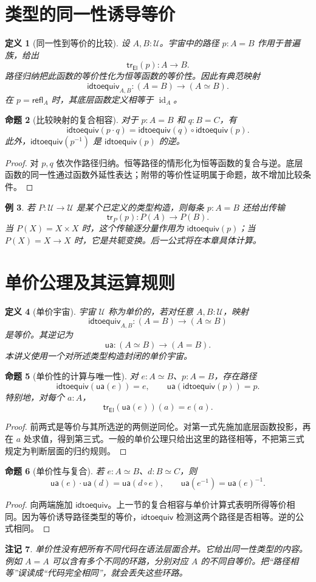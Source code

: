 \documentclass[12pt,oneside,openany,fontset=none]{ctexbook}
\theoremstyle{cn}
\newtheorem{definition}{定义}[chapter]
\newtheorem{example}[definition]{例}
\newtheorem{proposition}[definition]{命题}
\newtheorem{remark}[definition]{注记}
\numberwithin{equation}{chapter}
\newcommand{\U}{\mathcal U}
\newcommand{\id}{\operatorname{id}}
\newcommand{\refl}{\mathsf{refl}}
\newcommand{\tr}{\mathsf{tr}}
\newcommand{\ua}{\mathsf{ua}}
\newcommand{\idtoequiv}{\mathsf{idtoequiv}}
\begin{document}
\section{类型的同一性诱导等价}
\begin{definition}[同一性到等价的比较]
设 $A,B:\U$。宇宙中的路径 $p:A=B$ 作用于普遍族，给出
\[
\tr_{\mathsf{El}}(p):A\to B.
\]
路径归纳把此函数的等价性化为恒等函数的等价性。因此有典范映射
\[
\idtoequiv_{A,B}:(A=B)\longrightarrow(A\simeq B).
\]
在 $p=\refl_A$ 时，其底层函数定义相等于 $\id_A$。
\end{definition}
\begin{proposition}[比较映射的复合相容]
对于 $p:A=B$ 和 $q:B=C$，有
\[
\idtoequiv(p\cdot q)
=\idtoequiv(q)\circ\idtoequiv(p).
\]
此外，$\idtoequiv(p^{-1})$ 是 $\idtoequiv(p)$ 的逆。
\end{proposition}
\begin{proof}
对 $p,q$ 依次作路径归纳。恒等路径的情形化为恒等函数的复合与逆。底层函数的同一性通过函数外延性表达；附带的等价性证明属于命题，故不增加比较条件。
\end{proof}
\begin{example}
若 $P:\U\to\U$ 是某个已定义的类型构造，则每条 $p:A=B$ 还给出传输
\[
\tr_P(p):P(A)\to P(B).
\]
当 $P(X)=X\times X$ 时，这个传输逐分量作用为 $\idtoequiv(p)$；当 $P(X)=X\to X$ 时，它是共轭变换。后一公式将在本章具体计算。
\end{example}

\section{单价公理及其运算规则}
\begin{definition}[单价宇宙]\label{def:univalence}
宇宙 $\U$ 称为单价的，若对任意 $A,B:\U$，映射
\[
\idtoequiv_{A,B}:(A=B)\to(A\simeq B)
\]
是等价。其逆记为
\[
\ua:(A\simeq B)\to(A=B).
\]
本讲义使用一个对所述类型构造封闭的单价宇宙。
\end{definition}
\begin{proposition}[单价性的计算与唯一性]
对 $e:A\simeq B$、$p:A=B$，存在路径
\[
\idtoequiv(\ua(e))=e,
\qquad
\ua(\idtoequiv(p))=p.
\]
特别地，对每个 $a:A$，
\[
\tr_{\mathsf{El}}(\ua(e))(a)=e(a).
\]
\end{proposition}
\begin{proof}
前两式是等价与其所选逆的两侧逆同伦。对第一式先施加底层函数投影，再在 $a$ 处求值，得到第三式。一般的单价公理只给出这里的路径相等，不把第三式规定为判断层面的归约规则。
\end{proof}
\begin{proposition}[单价性与复合]
若 $e:A\simeq B$、$d:B\simeq C$，则
\[
\ua(e)\cdot\ua(d)=\ua(d\circ e),
\qquad
\ua(e^{-1})=\ua(e)^{-1}.
\]
\end{proposition}
\begin{proof}
向两端施加 $\idtoequiv$。上一节的复合相容与单价计算式表明所得等价相同。因为等价诱导路径类型的等价，$\idtoequiv$ 检测这两个路径是否相等。逆的公式相同。
\end{proof}
\begin{remark}
单价性没有把所有不同代码在语法层面合并。它给出同一性类型的内容。例如 $A=A$ 可以含有多个不同的环路，分别对应 $A$ 的不同自等价。把“路径相等”误读成“代码完全相同”，就会丢失这些环路。
\end{remark}
\end{document}
